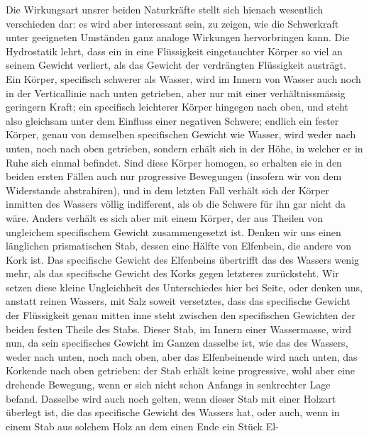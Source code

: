 Die Wirkungsart unsrer beiden Naturkräfte stellt sich hienach wesentlich verschieden dar: es wird aber interessant sein, zu zeigen, wie die Schwerkraft unter geeigneten Umständen ganz analoge Wirkungen hervorbringen kann. Die Hydrostatik lehrt, dass ein in eine Flüssigkeit eingetauchter Körper so viel an seinem Gewicht verliert, als das Gewicht der verdrängten Flüssigkeit austrägt. Ein Körper, specifisch schwerer als Wasser, wird im Innern von Wasser auch noch in der Verticallinie nach unten getrieben, aber nur mit einer verhältnissmässig geringern Kraft; ein specifisch leichterer Körper hingegen nach oben, und steht also gleichsam unter dem Einfluss einer negativen Schwere; endlich ein fester Körper, genau von demselben specifischen Gewicht wie Wasser, wird weder nach unten, noch nach oben getrieben, sondern erhält sich in der Höhe, in welcher er in Ruhe sich einmal befindet. Sind diese Körper homogen, so erhalten sie in den beiden ersten Fällen auch nur progressive Bewegungen (insofern wir von dem Widerstande abstrahiren), und in dem letzten Fall verhält sich der Körper inmitten des Wassers völlig indifferent, als ob die Schwere für ihn gar nicht da wäre. Anders verhält es sich aber mit einem Körper, der aus Theilen von ungleichem specifischem Gewicht zusammengesetzt ist. Denken wir uns einen länglichen prismatischen Stab, dessen eine Hälfte von Elfenbein, die andere von Kork ist. Das specifische Gewicht des Elfenbeins übertrifft das des Wassers wenig mehr, als das specifische Gewicht des Korks gegen letzteres zurücksteht. Wir setzen diese kleine Ungleichheit des Unterschiedes hier bei Seite, oder denken uns, anstatt reinen Wassers, mit Salz soweit versetztes, dass das specifische Gewicht der Flüssigkeit genau mitten inne steht zwischen den specifischen Gewichten der beiden festen Theile des Stabs. Dieser Stab, im Innern einer Wassermasse, wird nun, da sein specifisches Gewicht im Ganzen dasselbe ist, wie das des Wassers, weder nach unten, noch nach oben, aber das Elfenbeinende wird nach unten, das Korkende nach oben getrieben: der Stab erhält keine progressive, wohl aber eine drehende Bewegung, wenn er sich nicht schon Anfangs in senkrechter Lage befand. Dasselbe wird auch noch gelten, wenn dieser Stab mit einer Holzart überlegt ist, die das specifische Gewicht des Wassers hat, oder auch, wenn in einem Stab aus solchem Holz an dem einen Ende ein Stück El-
\par\clearpage
{}
